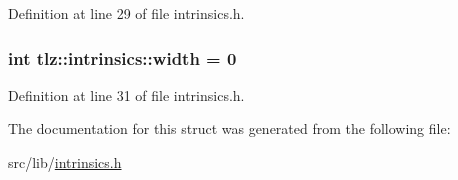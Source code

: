 Definition at line 29 of file intrinsics.\+h.

\subsubsection[{\texorpdfstring{width}{width}}]{\setlength{\rightskip}{0pt plus 5cm}int tlz\+::intrinsics\+::width = 0}\hypertarget{structtlz_1_1intrinsics_adfe46284279b43856cc06c857b20518f}{}\label{structtlz_1_1intrinsics_adfe46284279b43856cc06c857b20518f}


Definition at line 31 of file intrinsics.\+h.



The documentation for this struct was generated from the following file\+:\begin{DoxyCompactItemize}
\item 
src/lib/\hyperlink{intrinsics_8h}{intrinsics.\+h}\end{DoxyCompactItemize}
